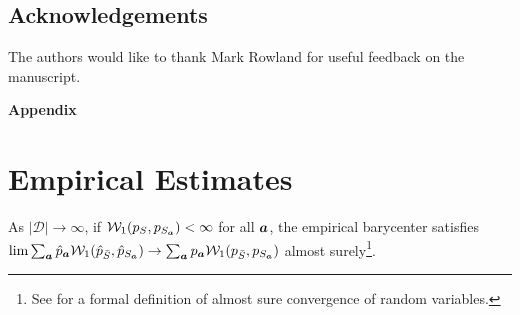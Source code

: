 \documentclass[letterpaper]{article}
\theoremstyle{definition}
\newcommand{\W}{\mathcal{W}}
\newcommand{\bS}{\bar{S}}
\begin{document}
\subsection*{Acknowledgements}
The authors would like to thank Mark Rowland for useful feedback on the manuscript.
%



\clearpage

\appendix
\onecolumn
{\Large \bf Appendix}
\section{Empirical Estimates}

\setcounter{lemma}{0}
\begin{lemma}\label{lemma::subgradient_cost}
As $| \mathcal{D} | \rightarrow \infty$, if $\W_1(p_{S}, p_{S_{\va}})< \infty $ for all ${\bm{a}}$, the empirical barycenter satisfies $\lim \sum_{\va} \hat{p}_{\va} \W_1(\hat{p}_{\bS}, \hat{p}_{S_\va}) \rightarrow \sum_{\va} p_{\va} \W_1(p_{\bS}, p_{S_\va})$ almost surely\footnote{See \cite{klenke13probability} for a formal definition of almost sure convergence of random variables.}. \end{lemma}
\end{document}
